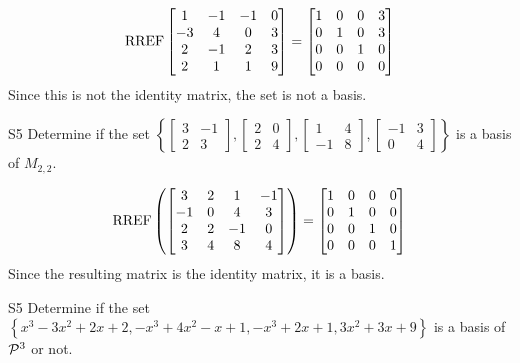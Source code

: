 \begin{solution}
$$\RREF \begin{bmatrix} 1 & -1 & -1 & 0 \\ -3 & 4 & 0 & 3 \\ 2 & -1 & 2 & 3 \\ 2 & 1 & 1 & 9 \end{bmatrix}=\begin{bmatrix} 1 &0 & 0 & 3 \\ 0 & 1 & 0 & 3 \\ 0 & 0 & 1 & 0 \\ 0 & 0 & 0 & 0 \end{bmatrix}$$
Since this is not the identity matrix, the set is not a basis.
\end{solution}
\begin{problem}{S5}
  Determine if the set \(\left\{
    \begin{bmatrix} 3 & -1 \\ 2 &3 \end{bmatrix},
    \begin{bmatrix} 2 & 0 \\ 2 & 4\end{bmatrix},
    \begin{bmatrix} 1 & 4 \\ -1 & 8\end{bmatrix},
    \begin{bmatrix} -1 & 3 \\ 0 & 4\end{bmatrix}
  \right\}\) is a basis of \(M_{2,2}\).
\end{problem}
\begin{solution}
  \[\RREF\left(
    \begin{bmatrix}
      3 & 2 & 1 & -1\\
      -1 & 0 & 4 & 3\\
      2 & 2 & -1 & 0\\
      3 & 4 & 8 & 4\\
    \end{bmatrix} \right)= \begin{bmatrix}
      1 & 0 & 0 & 0 \\
      0 & 1 & 0 & 0 \\
      0 & 0 & 1 & 0 \\
      0 & 0 & 0 & 1
    \end{bmatrix}
  \]
Since the resulting matrix is the identity matrix, it is a basis.
\end{solution}
\begin{problem}{S5}
Determine if the set $\left\{ x^3-3x^2+2x+2, -x^3+4x^2-x+1, -x^3+2x+1, 3x^2+3x+9 \right\}$ is a basis of $\P^3$ or not.
\end{problem}

